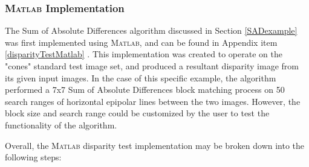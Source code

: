 \subsubsection{\textsc{Matlab} Implementation}
The Sum of Absolute Differences algorithm discussed in Section \ref{SADexample} was first implemented using \textsc{Matlab}, and can be found in Appendix item \ref{disparityTestMatlab} \cite{mccormick}. This implementation was created to operate on the "cones" standard test image set, and produced a resultant disparity image from its given input images. In the case of this specific example, the algorithm performed a 7x7 Sum of Absolute Differences block matching process on 50 search ranges of horizontal epipolar lines between the two images. However, the block size and search range could be customized by the user to test the functionality of the algorithm. 
\par
Overall, the \textsc{Matlab} disparity test implementation may be broken down into the following steps:
\par
\singlespacing
